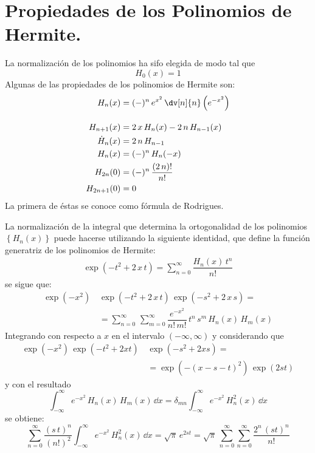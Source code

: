 \section{Propiedades de los Polinomios de Hermite.}
La normalización de los polinomios ha sifo elegida de modo tal que 
\[ H_{0}(x) = 1\]
Algunas de las propiedades de los polinomios de Hermite son:
\begin{align*}
H_{n} (x) &= (-)^{n} \, e^{x^{2}} \, \dv[n]{n} \left( e^{-x^{2}} \right) \\[1em]
H_{n+1} (x) &= 2 \, x \, H_{n} (x) - 2 \, n \, H_{n-1} (x) \\
\dot{H}_{n} (x) &= 2 \, n \, H_{n-1} \\
H_{n} (x) &= (-)^{n} \, H_{n} (-x) \\
H_{2n} (0) &= (-)^{n} \, \dfrac{(2 \, n)!}{n!} \\
H_{2n+1} (0) &= 0
\end{align*}
La primera de éstas se conoce como fórmula de Rodrigues.
\par
La normalización de la integral que determina la ortogonalidad de los polinomios $\left\{ H_{n} (x) \right\}$ puede hacerse utilizando la siguiente identidad, que define la función generatriz de los polinomios de Hermite:
\begin{align*}
\exp \left( -t^{2} + 2 \, x \, t \right) = \sum_{n=0}^{\infty} \dfrac{H_{n} (x) \, t^{n}}{n!}
\end{align*}
se sigue que:
\begin{align*}
\exp \left( -x^{2} \right) \, & \exp \left( -t^{2} + 2 \, x \, t \right) \, \exp \left( -s^{2} + 2 \, x \, s \right) = \\
&= \sum_{n=0}^{\infty} \, \sum_{m=0}^{\infty} \dfrac{e^{-x^{2}}}{n! \, m!} \, t^{n} \, s^{m} \, H_{n} (x) \, H_{m} (x)
\end{align*}
Integrando con respecto a $x$ en el intervalo $(-\infty, \infty)$ y considerando que
\begin{align*}
\exp \left( -x^{2} \right) \, \exp \left( -t^{2} + 2 x t \right) \, &\exp \left( -s^{2} + 2 x s \right) = \\
&= \exp \left( - (x - s - t)^{2} \right) \, \exp \left( 2 s t \right)
\end{align*}
y con el resultado
\[ \int_{-\infty}^{\infty} e^{-x^{2}} \, H_{n} (x) \, H_{m} (x) \, \dd{x} = \delta_{m n} \int_{-\infty}^{\infty} e^{-x^{2}} \, H_{n}^{2} (x) \, \dd{x} \]
se obtiene:
\[ \sum_{n=0}^{\infty} \dfrac{(s \, t)^{n}}{(n!)^{2}} \int_{-\infty}^{\infty} e^{-x^{2}} \, H_{n}^{2} (x) \, \dd{x} = \sqrt{\pi} \, e^{2 s t } = \sqrt{\pi} \, \sum_{n=0}^{\infty} \sum_{n=0}^{\infty} \dfrac{2^{n} \, (s t)^{n}}{n!} \]
